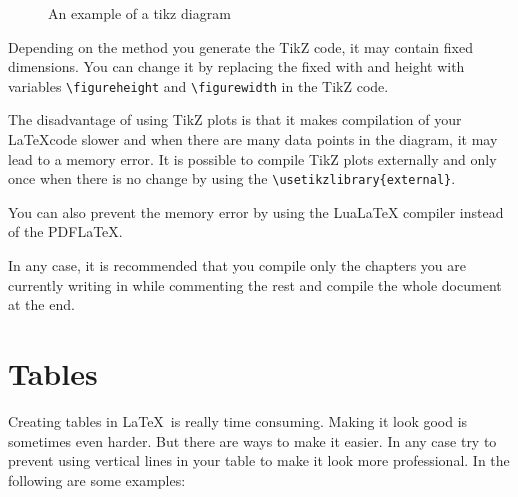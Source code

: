 \begin{QandA}
\begin{answered}
		
	\begin{figure}[ht]
		\centering
		\setlength\figureheight{5cm} 
		\setlength{}
	
    	
  		\caption{An example of a tikz diagram}
		\label{fig:TikzDiagramExample}

	\end{figure}
	
	Depending on the method you generate the TikZ code, it may contain fixed dimensions. You can change it by replacing the fixed with and height with variables \verb|\figureheight| and \verb|\figurewidth| in the TikZ code.
	
	The disadvantage of using TikZ plots is that it makes compilation of your \LaTeX code slower and when there are many data points in the diagram, it may lead to a memory error. It is possible to compile TikZ plots externally and only once when there is no change by using the \verb|\usetikzlibrary{external}|.
	
	You can also prevent the memory error by using the LuaLaTeX compiler instead of the PDFLaTeX.
	
	In any case, it is recommended that you compile only the chapters you are currently writing in while commenting the rest and compile the whole document at the end.
	\end{answered}		


\end{QandA}




\section{Tables}
\label{sec:Tables}
Creating tables in \LaTeX\ is really time consuming. Making it look good is sometimes even harder. But there are ways to make it easier. In any case try to prevent using vertical lines in your table to make it look more professional. In the following are some examples:

